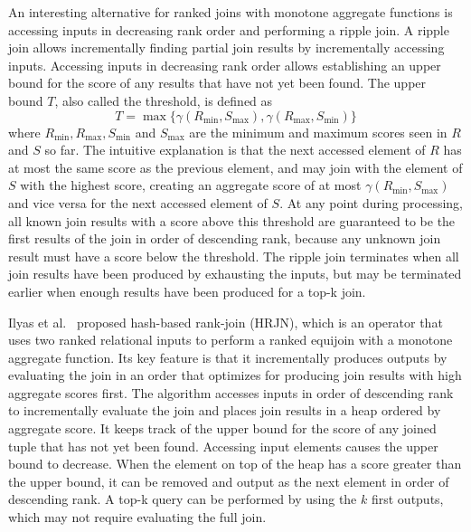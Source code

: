 
An interesting alternative for ranked joins with monotone aggregate functions is accessing inputs in decreasing rank order and performing a ripple join. A ripple join allows incrementally finding partial join results by incrementally accessing inputs. Accessing inputs in decreasing rank order allows establishing an upper bound for the score of any results that have not yet been found. The upper bound \(T\), also called the threshold, is defined as
\[
  T = \max\{\gamma(R_{\min}, S_{\max}), \gamma(R_{\max}, S_{\min})\}
\]
where \(R_{\min}, R_{\max}, S_{\min}\) and \(S_{\max}\) are the minimum and maximum scores seen in \(R\) and \(S\) so far.
The intuitive explanation is that the next accessed element of \(R\) has at most the same score as the previous element, and may join with the element of \(S\) with the highest score, creating an aggregate score of at most \(\gamma(R_{\min}, S_{\max})\) and vice versa for the next accessed element of \(S\). At any point during processing, all known join results with a score above this threshold are guaranteed to be the first results of the join in order of descending rank, because any unknown join result must have a score below the threshold. The ripple join terminates when all join results have been produced by exhausting the inputs, but may be terminated earlier when enough results have been produced for a top-k join.

Ilyas et al.~\cite{ilyas2004supporting} proposed hash-based rank-join (HRJN), which is an operator that uses two ranked relational inputs to perform a ranked equijoin with a monotone aggregate function. Its key feature is that it incrementally produces outputs by evaluating the join in an order that optimizes for producing join results with high aggregate scores first. The algorithm accesses inputs in order of descending rank to incrementally evaluate the join and places join results in a heap ordered by aggregate score. It keeps track of the upper bound for the score of any joined tuple that has not yet been found. Accessing input elements causes the upper bound to decrease. When the element on top of the heap has a score greater than the upper bound, it can be removed and output as the next element in order of descending rank. A top-k query can be performed by using the \(k\) first outputs, which may not require evaluating the full join.

